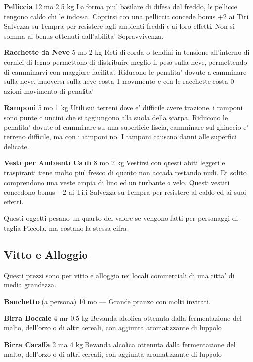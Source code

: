 \documentclass[a4paper,11pt,twoside,openany]{dndbook}
\begin{document}
{\textbf{Pelliccia} 12 mo 2.5 kg La forma piu' basilare di difesa dal freddo, le pellicce tengono caldo chi le indossa. Coprirsi con una pelliccia concede bonus +2 ai Tiri Salvezza su Tempra per resistere agli ambienti freddi e ai loro effetti. Non si somma ai bonus ottenuti dall'abilita' Sopravvivenza.

\textbf{Racchette da Neve} 5 mo 2 kg Reti di corda o tendini in tensione all'interno di cornici di legno permettono di distribuire meglio il peso sulla neve, permettendo di camminarvi con maggiore facilita'. Riducono le penalita' dovute a camminare sulla neve, muoversi sulla neve costa 1 movimento e con le racchette costa 0 azioni movimento di penalita'

\textbf{Ramponi} 5 mo 1 kg Utili sui terreni dove e' difficile avere trazione, i ramponi sono punte o uncini che si aggiungono alla suola della scarpa. Riducono le penalita' dovute al camminare su una superficie liscia, camminare sul ghiaccio e' terreno difficile, ma con i ramponi no. I ramponi causano danni alle superfici delicate.

\textbf{Vesti per Ambienti Caldi} 8 mo 2 kg Vestirsi con questi abiti leggeri e traspiranti tiene molto piu' fresco di quanto non accada restando nudi. Di solito comprendono una veste ampia di lino ed un turbante o velo. Questi vestiti concedono bonus +2 ai Tiri Salvezza su Tempra per resistere al caldo ed ai suoi effetti. 

Questi oggetti pesano un quarto del valore se vengono fatti per personaggi
di taglia Piccola, ma costano la stessa cifra.

\pagebreak

\subsection{Vitto e Alloggio}

\label{vitto-e-alloggio}

Questi prezzi sono per vitto e alloggio nei locali commerciali di una citta' di media grandezza.

\textbf{Banchetto} (a persona) 10 mo --- Grande pranzo con molti invitati.

\textbf{Birra Boccale} 4 mr 0.5 kg Bevanda alcolica ottenuta dalla fermentazione del malto, dell'orzo o di altri cereali, con aggiunta aromatizzante di luppolo

\textbf{Birra Caraffa} 2 ma 4 kg Bevanda alcolica ottenuta dalla fermentazione del malto, dell'orzo o di altri cereali, con aggiunta aromatizzante di luppolo

}
\end{document}
